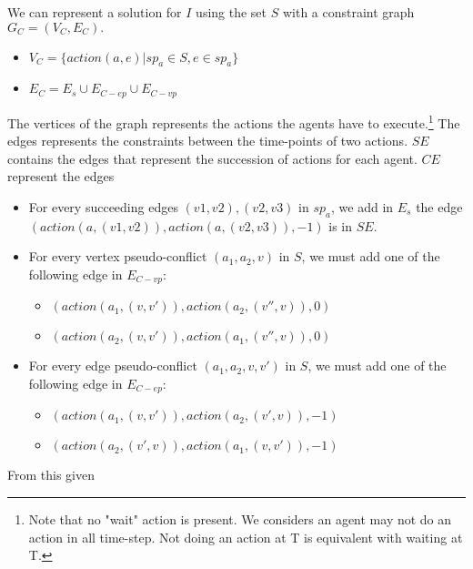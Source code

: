 We can represent a solution for $I$ using the set $S$ with a constraint graph $G_C=(V_C,E_C).$
\begin{itemize}
  \item $V_C = \{action(a,e) | sp_a \in S, e \in sp_a \}$
  \item $E_C = E_s \cup E_{C-ep} \cup E_{C-vp}$
\end{itemize}
The vertices of the graph represents the actions the agents have to execute.\footnote{Note that no "wait" action is present. We considers an agent may not do an action in all time-step. Not doing an action at T is equivalent with waiting at T.}
The edges represents the constraints between the time-points of two actions. $SE$ contains the edges that represent the succession of actions for each agent. $CE$ represent the edges

\begin{itemize}
  \item For every succeeding edges $(v1,v2),(v2,v3)$ in $sp_a$, we add in $E_s$ the edge $(action(a,(v1,v2)),action(a,(v2,v3)),-1)$ is in $SE$.
  \item For every vertex pseudo-conflict $(a_1,a_2,v)$ in $S$, we must add one of the following edge in $E_{C-vp}$:
  \begin{itemize}
    \item $(action(a_1,(v,v')),action(a_2,(v'',v)),0)$
    \item $(action(a_2,(v,v')),action(a_1,(v'',v)),0)$
  \end{itemize}
  \item For every edge pseudo-conflict $(a_1,a_2,v,v')$ in $S$, we must add one of the following edge in $E_{C-ep}$:
  \begin{itemize}
    \item $(action(a_1,(v,v')),action(a_2,(v',v)),-1)$
    \item $(action(a_2,(v',v)),action(a_1,(v,v')),-1)$
  \end{itemize}
\end{itemize}

From this given
